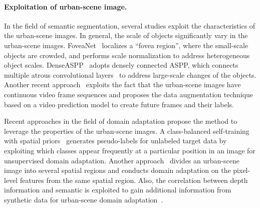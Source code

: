 \documentclass[10pt,twocolumn,letterpaper]{article}
\begin{document}
\vspace*{-0.1cm}
\paragraph{Exploitation of urban-scene image.}
\vspace*{-0.4cm}
In the field of semantic segmentation, several studies exploit the characteristics of the urban-scene images. In general, the scale of objects significantly vary in the urban-scene images. FoveaNet~\cite{Li2017FoveaNetPU} localizes a ``fovea region'', where the small-scale objects are crowded, and performs scale normalization to address heterogeneous object scales. DenseASPP~\cite{yang2018denseaspp} adopts densely connected ASPP, which connects multiple atrous convolutional layers~\cite{huang2017densely} to address large-scale changes of the objects. Another recent approach~\cite{zhu2019improving} exploits the fact that the urban-scene images have continuous video frame sequences and proposes the data augmentation technique based on a video prediction model to create future frames and their labels.



Recent approaches in the field of domain adaptation propose the method to leverage the properties of the urban-scene images. A class-balanced self-training with spatial priors~\cite{zou2018unsupervised} generates pseudo-labels for unlabeled target data by exploiting which classes appear frequently at a particular position in an image for unsupervised domain adaptation. Another approach~\cite{chen2018road} divides an urban-scene image into several spatial regions and conducts domain adaptation on the pixel-level features from the same spatial region. 
Also, 
the correlation between depth information and semantic is exploited to gain additional information from synthetic data for urban-scene domain adaptation~\cite{chen2019learning}.
\end{document}
